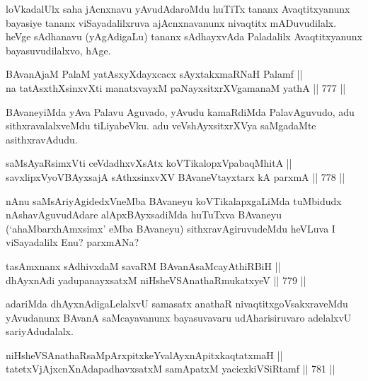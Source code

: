 \begin{artha} 
loVkadalUlx saha jAcnxnavu yAvudAdaroMdu huTiTx tananx Avaqtitxyanunx bayasiye tananx viSayadalilxruva ajAcnxnavanunx nivaqtitx mADuvudilalx. heVge sAdhanavu (yAgAdigaLu) tananx sAdhayxvAda Paladalilx Avaqtitxyanunx bayasuvudilalxvo, hAge.
\end{artha}


\begin{shl}
BAvanAjaM PalaM yatAsxyXdayxcacx sAyxtakxmaRNaH Palamf || \\
na tatAsxthXsinxvXti manatxvayxM paNayxsitxrXVgamanaM yathA \hfill || 777 ||  
\end{shl}

\begin{artha} 
BAvaneyiMda yAva Palavu Aguvado, yAvudu kamaRdiMda PalavAguvudo, adu sithxravalalxveMdu tiLiyabeVku. adu veVshAyxsitxrXVya saMgadaMte asithxravAdudu.
\end{artha}

\begin{shl}
saMsAyaRsimxVti ceVdadhxvXsAtx koVTikalopxVpabaqMhitA || \\
savxlipxVyoVBAyxsajA sAthxsinxvXV BAvaneVtayxtarx kA parxmA \hfill || 778 ||  
\end{shl}

\begin{artha} 
nAnu saMsAriyAgidedxVneMba BAvaneyu koVTikalapxgaLiMda tuMbidudx 
nAshavAguvudAdare alApxBAyxsadiMda huTuTxva BAvaneyu 
(`ahaMbarxhAmxsimx' eMba BAvaneyu) sithxravAgiruvudeMdu heVLuva I 
viSayadalilx Enu? parxmANa?
\end{artha}

\begin{shl}
tasAmxnanx sAdhivxdaM savaRM BAvanAsaMcayAthiRBiH || \\
dhAyxnAdi yadupanayxsatxM niHsheVSAnathaRmukatxyeV \hfill || 779 ||  
\end{shl}

\begin{artha} 
adariMda dhAyxnAdigaLelalxvU samasatx anathaR nivaqtitxgoVsakxraveMdu yAvudanunx BAvanA saMcayavanunx bayasuvavaru udAharisiruvaro adelalxvU sariyAdudalalx.
\end{artha}

\begin{shl}
niHsheVSAnathaRsaMpArxpitxkeYvalAyxnApitxkaqtatxmaH || \\
tatetxVjAjxcnXnAdapadhavxsatxM samApatxM yacicxkiVSiRtamf \hfill || 781 ||  
\end{shl}

